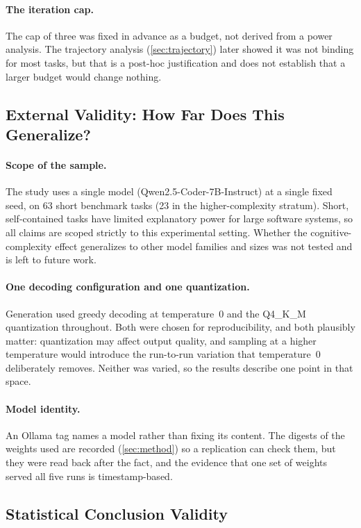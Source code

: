 \paragraph{The iteration cap.} The cap of three was fixed in advance as a budget,
not derived from a power analysis. The trajectory analysis
(\cref{sec:trajectory}) later showed it was not binding for most tasks, but that is
a post-hoc justification and does not establish that a larger budget would change
nothing.

\subsection{External Validity: How Far Does This Generalize?}

\paragraph{Scope of the sample.} The study uses a single model
(Qwen2.5-Coder-7B-Instruct) at a single fixed seed, on 63 short benchmark tasks
(23 in the higher-complexity stratum). Short, self-contained tasks have limited
explanatory power for large software systems, so all claims are scoped strictly to
this experimental setting. Whether the cognitive-complexity effect generalizes to
other model families and sizes was not tested and is left to future work.

\paragraph{One decoding configuration and one quantization.} Generation used greedy
decoding at temperature~0 and the Q4\_K\_M quantization throughout. Both were chosen
for reproducibility, and both plausibly matter: quantization may affect output
quality, and sampling at a higher temperature would introduce the run-to-run
variation that temperature~0 deliberately removes. Neither was varied, so the
results describe one point in that space.

\paragraph{Model identity.} An Ollama tag names a model rather than fixing its
content. The digests of the weights used are recorded (\cref{sec:method}) so a
replication can check them, but they were read back after the fact, and the evidence
that one set of weights served all five runs is timestamp-based.

\subsection{Statistical Conclusion Validity}

